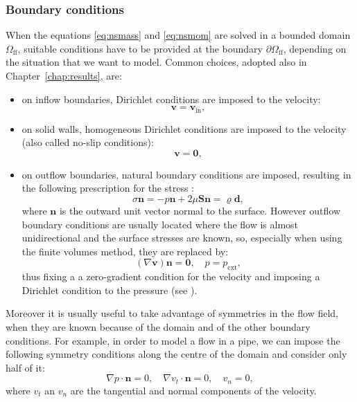 \subsubsection{Boundary conditions}
When the equations \eqref{eq:nsmass} and \eqref{eq:nsmom} are solved in a 
bounded domain $\Omega_\text{ff}$, suitable conditions have to be provided at 
the boundary $\partial \Omega_\text{ff}$, depending on the situation that we 
want to model. Common choices, adopted also in Chapter~\ref{chap:results}, are:
\begin{itemize}
	\item on inflow boundaries, Dirichlet conditions are imposed to the 
	velocity:
	\begin{equation} \label{eq:inflow}
		\mathbf{v} = \mathbf{v}_\text{in},
	\end{equation}
	\item on solid walls, homogeneous Dirichlet conditions are imposed to the 
	velocity (also called no-slip conditions):
	\begin{equation} \label{eq:noslip}
		\mathbf{v} = \mathbf{0},
	\end{equation}
	\item on outflow boundaries, natural boundary conditions are imposed, 
	resulting in the following prescription for the stress :
	\begin{equation}
		\sigma \mathbf{n} = -p\mathbf{n}+2\mu \mathbf{Sn} = \varrho\mathbf{d},
	\end{equation}
	where $\mathbf{n}$ is the outward unit vector normal to the surface. 
	However outflow boundary conditions are usually located where the flow is 
	almost unidirectional and the surface stresses are known, so, especially 
	when using the finite volumes method, they are replaced by:
	\begin{equation} \label{eq:outflow}
	(\nabla \mathbf{v})\mathbf{n} = \mathbf{0}, \quad p = p_\text{ext},
	\end{equation}
	thus fixing a a zero-gradient condition for the velocity and imposing a 
	Dirichlet condition to the pressure (see \cite{main:vermal}).
\end{itemize}
Moreover it is usually useful to take advantage of symmetries in the flow 
field, 
when they are known because of the domain and of the other boundary conditions. 
For example, in order to model a flow in a pipe, we can impose the following 
symmetry conditions along the centre of the domain and consider only half of it:
\begin{equation}
\nabla p \cdot \mathbf{n} = 0, \quad \nabla v_t \cdot \mathbf{n} = 0, \quad
v_n = 0,
\end{equation}
where $v_t$ an $v_n$ are the tangential and normal components of the velocity.
%
